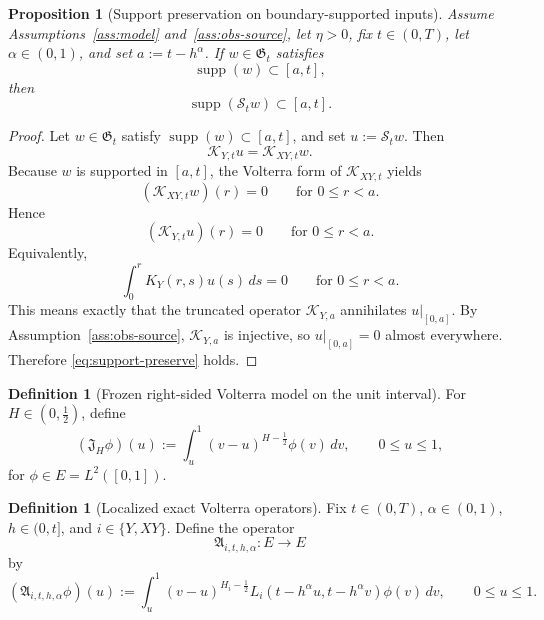 \documentclass[11pt,a4paper]{amsart}
\theoremstyle{plain}
\newtheorem{proposition}[theorem]{Proposition}
\theoremstyle{definition}
\newtheorem{definition}[theorem]{Definition}
\theoremstyle{remark}
\begin{document}
\begin{proposition}[Support preservation on boundary-supported inputs]
\label{prop:support-preserve}
Assume Assumptions~\ref{ass:model} and~\ref{ass:obs-source}, let $\eta>0$, fix $t\in(0,T)$,
let $\alpha\in(0,1)$, and set $a:=t-h^\alpha$. If $w\in\mathfrak G_t$ satisfies
\[
\operatorname{supp}(w)\subset[a,t],
\]
then
\begin{equation}\label{eq:support-preserve}
\operatorname{supp}(\mathcal S_t w)\subset[a,t].
\end{equation}
\end{proposition}

\begin{proof}
Let $w\in\mathfrak G_t$ satisfy $\operatorname{supp}(w)\subset[a,t]$, and set
$u:=\mathcal S_t w$. Then
\[
\mathcal K_{Y,t}u=\mathcal K_{XY,t}w.
\]
Because $w$ is supported in $[a,t]$, the Volterra form of $\mathcal K_{XY,t}$ yields
\[
(\mathcal K_{XY,t}w)(r)=0
\qquad\text{for }0\le r<a.
\]
Hence
\[
(\mathcal K_{Y,t}u)(r)=0
\qquad\text{for }0\le r<a.
\]
Equivalently,
\[
\int_0^r K_Y(r,s)u(s)\,ds=0
\qquad\text{for }0\le r<a.
\]
This means exactly that the truncated operator $\mathcal K_{Y,a}$ annihilates $u|_{[0,a]}$.
By Assumption~\ref{ass:obs-source}, $\mathcal K_{Y,a}$ is injective, so $u|_{[0,a]}=0$ almost
everywhere. Therefore \eqref{eq:support-preserve} holds.
\end{proof}

\begin{definition}[Frozen right-sided Volterra model on the unit interval]
\label{def:unit-model}
For $H\in(0,\tfrac12)$, define
\begin{equation}\label{eq:JH}
(\mathfrak J_H\phi)(u)
:=
\int_u^1 (v-u)^{H-\frac12}\phi(v)\,dv,
\qquad 0\le u\le 1,
\end{equation}
for $\phi\in E=L^2([0,1])$.
\end{definition}

\begin{definition}[Localized exact Volterra operators]\label{def:local-volterra}
Fix $t\in(0,T)$, $\alpha\in(0,1)$, $h\in(0,t]$, and $i\in\{Y,XY\}$. Define the operator
\[
\mathfrak A_{i,t,h,\alpha}:E\to E
\]
by
\begin{equation}\label{eq:Aih}
(\mathfrak A_{i,t,h,\alpha}\phi)(u)
:=
\int_u^1 (v-u)^{H_i-\frac12}
L_i(t-h^\alpha u,t-h^\alpha v)\phi(v)\,dv,
\qquad 0\le u\le 1.
\end{equation}
\end{definition}
\end{document}
